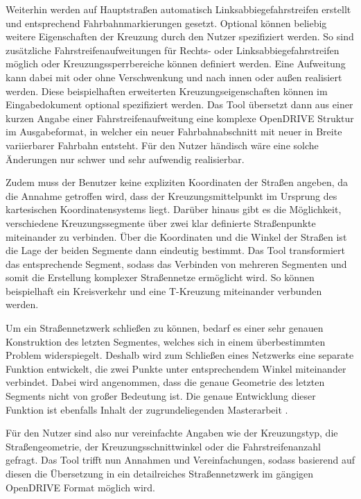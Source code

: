 Weiterhin werden auf Hauptstraßen automatisch Linksabbiegefahrstreifen erstellt und entsprechend Fahrbahnmarkierungen gesetzt. Optional können beliebig weitere Eigenschaften der Kreuzung durch den Nutzer spezifiziert werden. So sind zusätzliche Fahrstreifenaufweitungen für Rechts- oder Linksabbiegefahrstreifen möglich oder Kreuzungssperrbereiche können definiert werden. Eine Aufweitung kann dabei mit oder ohne Verschwenkung und nach innen oder außen realisiert werden. Diese beispielhaften erweiterten Kreuzungseigenschaften können im Eingabedokument optional spezifiziert werden. Das Tool übersetzt dann aus einer kurzen Angabe einer Fahrstreifenaufweitung eine komplexe OpenDRIVE Struktur im Ausgabeformat, in welcher ein neuer Fahrbahnabschnitt mit neuer in Breite variierbarer Fahrbahn entsteht. Für den Nutzer händisch wäre eine solche Änderungen nur schwer und sehr aufwendig realisierbar.

Zudem muss der Benutzer keine expliziten Koordinaten der Straßen angeben, da die Annahme getroffen wird, dass der Kreuzungsmittelpunkt im Ursprung des kartesischen Koordinatensystems liegt. Darüber hinaus gibt es die Möglichkeit, verschiedene Kreuzungssegmente über zwei klar definierte Straßenpunkte miteinander zu verbinden. Über die Koordinaten und die Winkel der Straßen ist die Lage der beiden Segmente dann eindeutig bestimmt. Das Tool transformiert das entsprechende Segment, sodass das Verbinden von mehreren Segmenten und somit die Erstellung komplexer Straßennetze ermöglicht wird. So können beispielhaft ein Kreisverkehr und eine T-Kreuzung miteinander verbunden werden.

Um ein Straßennetzwerk schließen zu können, bedarf es einer sehr genauen Konstruktion des letzten Segmentes, welches sich in einem überbestimmten Problem widerspiegelt. Deshalb wird zum Schließen eines Netzwerks eine separate Funktion entwickelt, die zwei Punkte unter entsprechendem Winkel miteinander verbindet. Dabei wird angenommen, dass die genaue Geometrie des letzten Segments nicht von großer Bedeutung ist. Die genaue Entwicklung dieser Funktion ist ebenfalls Inhalt der zugrundeliegenden Masterarbeit \cite{Russ.2019}.

Für den Nutzer sind also nur vereinfachte Angaben wie der Kreuzungstyp, die Straßengeometrie, der Kreuzungsschnittwinkel oder die Fahrstreifenanzahl gefragt. Das Tool trifft nun Annahmen und Vereinfachungen, sodass basierend auf diesen die Übersetzung in ein detailreiches Straßennetzwerk im gängigen OpenDRIVE Format möglich wird.


